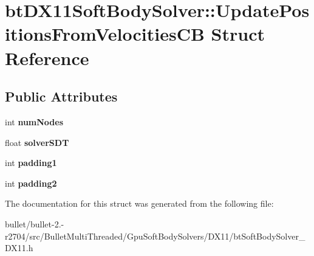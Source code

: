 \hypertarget{structbt_d_x11_soft_body_solver_1_1_update_positions_from_velocities_c_b}{\section{bt\+D\+X11\+Soft\+Body\+Solver\+:\+:Update\+Positions\+From\+Velocities\+C\+B Struct Reference}
\label{structbt_d_x11_soft_body_solver_1_1_update_positions_from_velocities_c_b}
}
\subsection*{Public Attributes}
\begin{DoxyCompactItemize}
\item 
\hypertarget{structbt_d_x11_soft_body_solver_1_1_update_positions_from_velocities_c_b_a8fdb9645f7e92a1b8386833252aca18b}{int {\bfseries num\+Nodes}}\label{structbt_d_x11_soft_body_solver_1_1_update_positions_from_velocities_c_b_a8fdb9645f7e92a1b8386833252aca18b}

\item 
\hypertarget{structbt_d_x11_soft_body_solver_1_1_update_positions_from_velocities_c_b_a7a26bce1c481d5160fcfe4960fb61974}{float {\bfseries solver\+S\+D\+T}}\label{structbt_d_x11_soft_body_solver_1_1_update_positions_from_velocities_c_b_a7a26bce1c481d5160fcfe4960fb61974}

\item 
\hypertarget{structbt_d_x11_soft_body_solver_1_1_update_positions_from_velocities_c_b_ad3e15989fca0799e3e8a76be7e1dc6f2}{int {\bfseries padding1}}\label{structbt_d_x11_soft_body_solver_1_1_update_positions_from_velocities_c_b_ad3e15989fca0799e3e8a76be7e1dc6f2}

\item 
\hypertarget{structbt_d_x11_soft_body_solver_1_1_update_positions_from_velocities_c_b_a58d72ff980886df5242e6f9aff2a0998}{int {\bfseries padding2}}\label{structbt_d_x11_soft_body_solver_1_1_update_positions_from_velocities_c_b_a58d72ff980886df5242e6f9aff2a0998}

\end{DoxyCompactItemize}


The documentation for this struct was generated from the following file\+:\begin{DoxyCompactItemize}
\item 
bullet/bullet-\/2.-\/r2704/src/\+Bullet\+Multi\+Threaded/\+Gpu\+Soft\+Body\+Solvers/\+D\+X11/bt\+Soft\+Body\+Solver\+\_\+\+D\+X11.\+h\end{DoxyCompactItemize}
